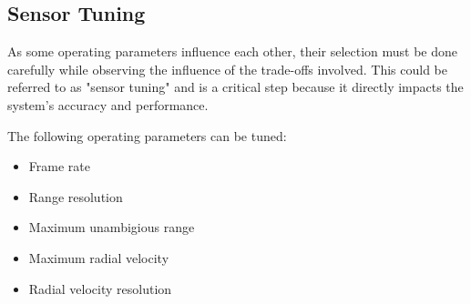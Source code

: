 \subsection{Sensor Tuning}
As some operating parameters influence each other, their selection must be done carefully while observing the influence of the trade-offs involved.
This could be referred to as "sensor tuning" and is a critical step because it directly impacts the system's accuracy and performance.

The following operating parameters can be tuned:
\begin{itemize}
    \item Frame rate
    \item Range resolution
    \item Maximum unambigious range
    \item Maximum radial velocity
    \item Radial velocity resolution
\end{itemize}

